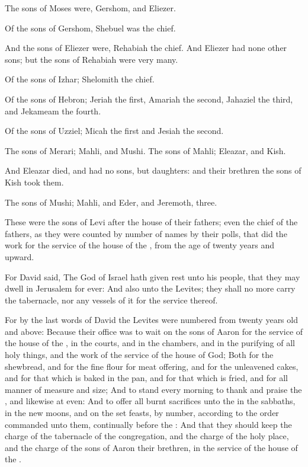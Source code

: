 \verse The sons of Moses were, Gershom, and Eliezer.

\verse Of the sons of Gershom, Shebuel was the chief.

\verse And the sons of Eliezer were, Rehabiah the chief. And Eliezer had none other sons; but the sons of Rehabiah were very many.

\verse Of the sons of Izhar; Shelomith the chief.

\verse Of the sons of Hebron; Jeriah the first, Amariah the second, Jahaziel the third, and Jekameam the fourth.

\verse Of the sons of Uzziel; Micah the first and Jesiah the second.

\verse The sons of Merari; Mahli, and Mushi. The sons of Mahli; Eleazar, and Kish.

\verse And Eleazar died, and had no sons, but daughters: and their brethren the sons of Kish took them.

\verse The sons of Mushi; Mahli, and Eder, and Jeremoth, three.

\verse These were the sons of Levi after the house of their fathers; even the chief of the fathers, as they were counted by number of names by their polls, that did the work for the service of the house of the \LORD, from the age of twenty years and upward.

\verse For David said, The \LORD God of Israel hath given rest unto his people, that they may dwell in Jerusalem for ever: \verse And also unto the Levites; they shall no more carry the tabernacle, nor any vessels of it for the service thereof.

\verse For by the last words of David the Levites were numbered from twenty years old and above: \verse Because their office was to wait on the sons of Aaron for the service of the house of the \LORD, in the courts, and in the chambers, and in the purifying of all holy things, and the work of the service of the house of God; \verse Both for the shewbread, and for the fine flour for meat offering, and for the unleavened cakes, and for that which is baked in the pan, and for that which is fried, and for all manner of measure and size; \verse And to stand every morning to thank and praise the \LORD, and likewise at even: \verse And to offer all burnt sacrifices unto the \LORD in the sabbaths, in the new moons, and on the set feasts, by number, according to the order commanded unto them, continually before the \LORD: \verse And that they should keep the charge of the tabernacle of the congregation, and the charge of the holy place, and the charge of the sons of Aaron their brethren, in the service of the house of the \LORD.


